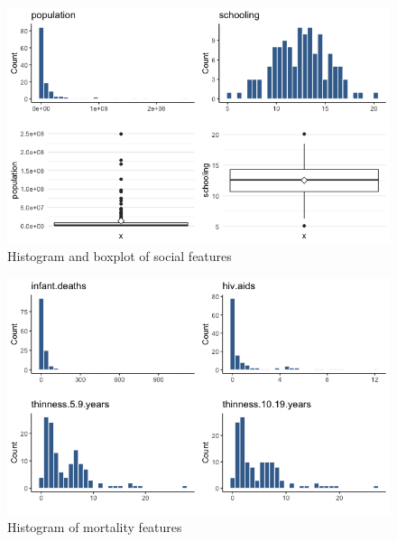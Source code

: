 
\begin{figure}[H]
	\centering
	\includegraphics{figures/eda/histogram_boxplot_social_features.png}
	\caption{Histogram and boxplot of social features}
	\label{fig:histogram_boxplot_social_features}
\end{figure}


\begin{figure}[H]
	\centering
	\includegraphics{figures/eda/histogram_mortality_features.png}
	\caption{Histogram of mortality features}
	\label{fig:histogram_mortality_features}
\end{figure}

